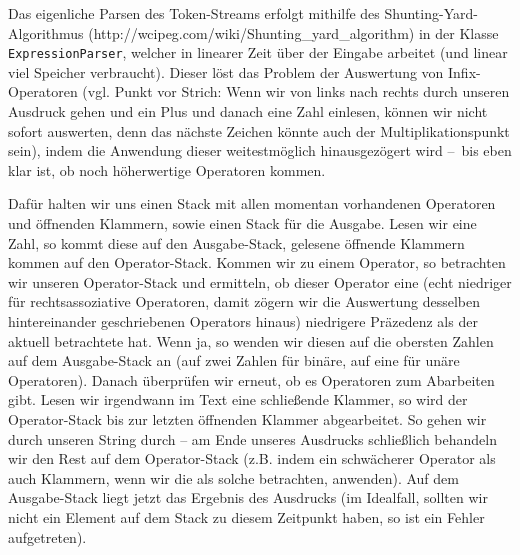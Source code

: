 Das eigenliche Parsen des Token-Streams erfolgt mithilfe des Shunting-Yard-Algorithmus (http://wcipeg.com/wiki/Shunting_yard_algorithm) in der Klasse \texttt{ExpressionParser}, welcher in linearer Zeit über der Eingabe arbeitet (und linear viel Speicher verbraucht). Dieser löst das Problem der Auswertung von Infix-Operatoren (vgl. Punkt vor Strich: Wenn wir von links nach rechts durch unseren Ausdruck gehen und ein Plus und danach eine Zahl einlesen, können wir nicht sofort auswerten, denn das nächste Zeichen könnte auch der Multiplikationspunkt sein), indem die Anwendung dieser weitestmöglich hinausgezögert wird – bis eben klar ist, ob noch höherwertige Operatoren kommen.

Dafür halten wir uns einen Stack mit allen momentan vorhandenen Operatoren und öffnenden Klammern, sowie einen Stack für die Ausgabe. Lesen wir eine Zahl, so kommt diese auf den Ausgabe-Stack, gelesene öffnende Klammern kommen auf den Operator-Stack. Kommen wir zu einem Operator, so betrachten wir unseren Operator-Stack und ermitteln, ob dieser Operator eine (echt niedriger für rechtsassoziative Operatoren, damit zögern wir die Auswertung desselben hintereinander geschriebenen Operators hinaus) niedrigere Präzedenz als der aktuell betrachtete hat. Wenn ja, so wenden wir diesen auf die obersten Zahlen auf dem Ausgabe-Stack an (auf zwei Zahlen für binäre, auf eine für unäre Operatoren). Danach überprüfen wir erneut, ob es Operatoren zum Abarbeiten gibt. Lesen wir irgendwann im Text eine schließende Klammer, so wird der Operator-Stack bis zur letzten öffnenden Klammer abgearbeitet. So gehen wir durch unseren String durch – am Ende unseres Ausdrucks schließlich behandeln wir den Rest auf dem Operator-Stack (z.B. indem ein schwächerer Operator als auch Klammern, wenn wir die als solche betrachten, anwenden). Auf dem Ausgabe-Stack liegt jetzt das Ergebnis des Ausdrucks (im Idealfall, sollten wir nicht ein Element auf dem Stack zu diesem Zeitpunkt haben, so ist ein Fehler aufgetreten).

